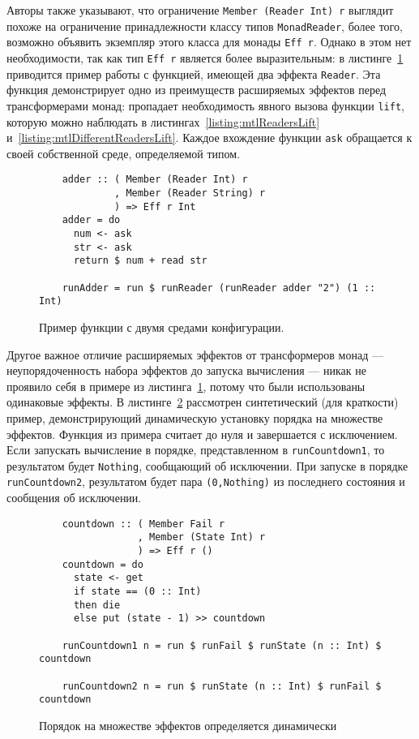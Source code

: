     Авторы также указывают, что ограничение
    \mbox{\lstinline{Member (Reader Int) r}} выглядит похоже на ограничение
    принадлежности классу типов \lstinline{MonadReader}, более того, возможно
    объявить экземпляр этого класса для монады \lstinline{Eff r}. Однако в этом нет
    необходимости, так как тип \lstinline{Eff r} является более выразительным:
    в листинге~\ref{listing:extEff2Readers} приводится пример работы с функцией,
    имеющей два эффекта \lstinline{Reader}. Эта функция демонстрирует одно из
    преимуществ расширяемых эффектов перед трансформерами монад: пропадает
    необходимость явного вызова функции \lstinline{lift}, которую можно наблюдать
    в листингах~\ref{listing:mtlReadersLift}
    и~\ref{listing:mtlDifferentReadersLift}. Каждое вхождение функции
    \lstinline{ask} обращается к своей собственной среде, определяемой типом.

    \begin{figure}[t]
    \begin{lstlisting}
    adder :: ( Member (Reader Int) r
             , Member (Reader String) r
             ) => Eff r Int
    adder = do
      num <- ask
      str <- ask
      return $ num + read str

    runAdder = run $ runReader (runReader adder "2") (1 :: Int)
    \end{lstlisting}
    \caption{Пример функции с двумя средами конфигурации.}
    \label{listing:extEff2Readers}
    \end{figure}

    Другое важное отличие расширяемых эффектов от трансформеров монад ---
    неупорядоченность набора эффектов до запуска вычисления --- никак не проявило
    себя в примере из листинга~\ref{listing:extEff2Readers}, потому что были
    использованы одинаковые эффекты. В листинге~\ref{listing:extEffOrdering}
    рассмотрен синтетический (для краткости) пример, демонстрирующий динамическую
    установку порядка на множестве эффектов. Функция из примера считает до нуля и
    завершается с исключением. Если запускать вычисление в порядке, представленном
    в \lstinline{runCountdown1}, то результатом будет \lstinline{Nothing},
    сообщающий об исключении. При запуске в порядке \lstinline{runCountdown2},
    результатом будет пара \lstinline{(0,Nothing)} из последнего состояния и
    сообщения об исключении.

    \begin{figure}[t]
    \begin{lstlisting}
    countdown :: ( Member Fail r
                 , Member (State Int) r
                 ) => Eff r ()
    countdown = do
      state <- get
      if state == (0 :: Int)
      then die
      else put (state - 1) >> countdown

    runCountdown1 n = run $ runFail $ runState (n :: Int) $ countdown

    runCountdown2 n = run $ runState (n :: Int) $ runFail $ countdown
    \end{lstlisting}
    \caption{Порядок на множестве эффектов определяется динамически}
    \label{listing:extEffOrdering}
    \end{figure}


